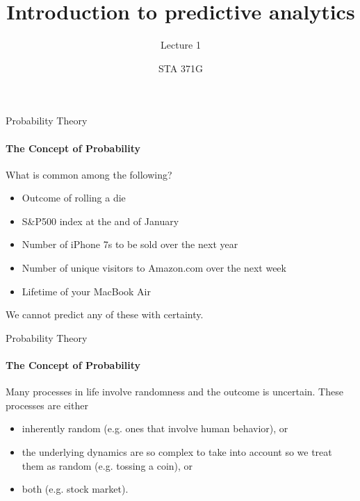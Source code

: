 \documentclass{beamer}\usepackage[]{graphicx}\usepackage[]{color}
\title{Introduction to predictive analytics}
\subtitle{Lecture 1}
\author{STA 371G}
\begin{document}
  
  

  \frame{\maketitle}



   \begin{darkframes}
  

    \begin{frame}[label=lists]{Probability Theory}
      \framesubtitle{The Concept of Probability}
      
      What is common among the following?
      
      \begin{itemize}
      	\item Outcome of rolling a die
      	\item S\&P500 index at the and of January
      	\item Number of iPhone 7s to be sold over the next year
      	\item Number of unique visitors to Amazon.com over the next week
      	\item Lifetime of your MacBook Air
      \end{itemize}
      
      We cannot predict any of these with certainty. 
      
      
      
      
    \end{frame}
    
    
    \begin{frame}[label=lists]{Probability Theory}
      \framesubtitle{The Concept of Probability}
      
	 	Many processes in life involve randomness and the outcome is uncertain. These processes are either 
	 	
	 	\begin{itemize}
      	\item inherently random (e.g. ones that involve human behavior), or
      	\item the underlying dynamics are so complex to take into account so we treat them as random (e.g. tossing a coin), or
      	\item both (e.g. stock market).
      	\end{itemize}
	 	

\end{frame}
\end{darkframes}
\end{document}
